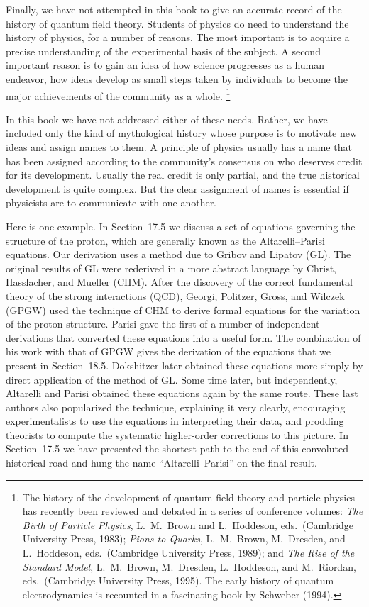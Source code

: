 Finally, we have not attempted in this book to give an accurate record of
the history of quantum field theory.  Students of physics do need to
understand the history of physics, for a number of reasons.  The most
important is to acquire a precise understanding of the experimental basis
of the subject.  A second important reason is to gain an idea of how
science progresses as a human endeavor, how ideas develop as small steps
taken by individuals to become the major achievements of the community as
a whole.%
\footnote{The history of the development of quantum field theory and
particle physics has recently been reviewed and debated in a series of
conference volumes: \emph{The Birth of Particle Physics}, L.~M.~Brown and
L.~Hoddeson, eds.\ (Cambridge University Press, 1983); \emph{Pions to
Quarks}, L.~M.~Brown, M.~Dresden, and L.~Hoddeson, eds.\ (Cambridge
University Press, 1989); and \emph{The Rise of the Standard Model},
L.~M.~Brown, M.~Dresden, L.~Hoddeson, and M.~Riordan, eds.\ (Cambridge
University Press, 1995).  The early history of quantum electrodynamics is
recounted in a fascinating book by Schweber (1994).}

In this book we have not addressed either of these needs.  Rather, we have
included only the kind of mythological history whose purpose is to motivate
new ideas and assign names to them.  A principle of physics usually has a
name that has been assigned according to the community's consensus on who
deserves credit for its development.  Usually the real credit is only
partial, and the true historical development is quite complex.  But the
clear assignment of names is essential if physicists are to communicate
with one another.

Here is one example.  In Section~17.5 we discuss a set of equations
governing the structure of the proton, which are generally known as the
Altarelli--Parisi equations.  Our derivation uses a method due to Gribov
and Lipatov (GL).  The original results of GL were rederived in a more
abstract language by Christ, Hasslacher, and Mueller (CHM).  After the
discovery of the correct fundamental theory of the strong interactions
(QCD), Georgi, Politzer, Gross, and Wilczek (GPGW) used the technique of
CHM to derive formal equations for the variation of the proton structure.
Parisi gave the first of a number of independent derivations that converted
these equations into a useful form.  The combination of his work with that
of GPGW gives the derivation of the equations that we present in
Section~18.5.  Dokshitzer later obtained these equations more simply by
direct application of the method of GL.  Some time later, but
independently, Altarelli and Parisi obtained these equations again by the
same route.  These last authors also popularized the technique, explaining
it very clearly, encouraging experimentalists to use the equations in
interpreting their data, and prodding theorists to compute the systematic
higher-order corrections to this picture.  In Section~17.5 we have
presented the shortest path to the end of this convoluted historical road
and hung the name ``Altarelli--Parisi'' on the final result.

